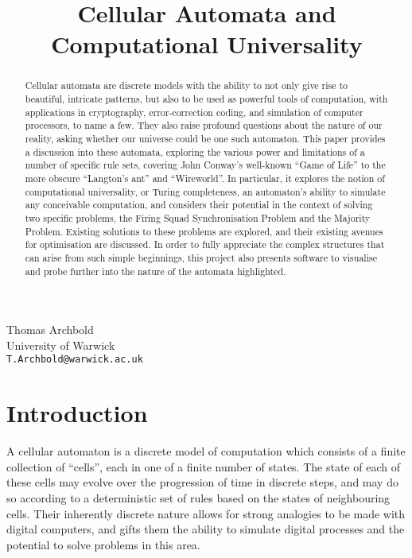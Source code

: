 \documentclass[11pt,a4paper]{article}
\title{Cellular Automata and Computational Universality}
\begin{document}
\maketitle

\begin{center}
    Thomas Archbold \\
    University of Warwick \\
    \texttt{T.Archbold@warwick.ac.uk}
\end{center}

\begin{abstract}
    Cellular automata are discrete models with the ability to not only give rise
    to beautiful, intricate patterns, but also to be used as powerful tools of
    computation, with applications in cryptography, error-correction coding, and
    simulation of computer processors, to name a few. They also raise profound
    questions about the nature of our reality, asking whether our universe could
    be one such automaton. This paper provides a discussion into these automata,
    exploring the various power and limitations of a number of specific rule
    sets, covering John Conway's well-known ``Game of Life'' to the more obscure
    ``Langton's ant'' and ``Wireworld''. In particular, it explores the notion
    of computational universality, or Turing completeness, an automaton's
    ability to simulate any conceivable computation, and considers their
    potential in the context of solving two specific problems, the Firing Squad
    Synchronisation Problem and the Majority Problem. Existing solutions to
    these problems are explored, and their existing avenues for optimisation are
    discussed. In order to fully appreciate the complex structures that can
    arise from such simple beginnings, this project also presents software to
    visualise and probe further into the nature of the automata highlighted.
\end{abstract}

\section{Introduction}
    A cellular automaton is a discrete model of computation which consists of a
    finite collection of ``cells'', each in one of a finite number of states.
    The state of each of these cells may evolve over the progression of time in
    discrete steps, and may do so according to a deterministic set of rules
    based on the states of neighbouring cells. Their inherently discrete nature
    allows for strong analogies to be made with digital computers, and gifts
    them the ability to simulate digital processes and the potential to solve
    problems in this area.
    
\end{document}
